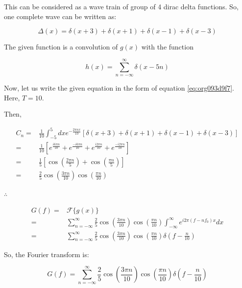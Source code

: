 \documentclass[a4paper,11pt]{article}
\begin{document}
This can be considered as a wave train of group of 4 dirac delta functions. So, one complete wave can be written as:

\begin{equation}
\label{eq:orga10d5ff}
\Delta(x) = \delta(x+3)+\delta(x+1)+\delta(x-1)+\delta(x-3)
\end{equation}

The given function is a convolution of \(g(x)\) with the function

\begin{equation}
\label{eq:org6854040}
h(x) = \sum_{n=-\infty}^{\infty} \delta(x-5n)
\end{equation}

Now, let us write the given equation in the form of equation \ref{eq:org093d9f7}. Here, \(T=10\).

Then,

\begin{equation*}
\begin{split}
C_n = & \frac{1}{10}\int_{-5}^{5} dx e^{-\frac{2\pi n x}{10}} \left[ \delta(x+3)+\delta(x+1)+\delta(x-1)+\delta(x-3)\right] \\
= & \frac{1}{10} \left[e^{\frac{i6\pi n }{10}}+e^{\frac{-i6\pi n }{10}}+e^{\frac{i2\pi n }{10}}+e^{\frac{-i2\pi n }{10}}\right] \\
= & \frac{1}{5}\left[\cos\left(\frac{2\pi n}{5}\right)+\cos\left(\frac{\pi n}{5}\right)\right] \\
= & \frac{2}{5} \cos\left(\frac{3\pi n}{10}\right)\cos\left(\frac{\pi n}{10}\right)
\end{split}
\end{equation*}

\(\therefore\)

\begin{equation*}
\begin{split}
G(f) = & \mathcal{F}\{g(x)\} \\
= & \sum_{n=-\infty}^{\infty}  \frac{2}{5} \cos\left(\frac{3\pi n}{10}\right)\cos\left(\frac{\pi n}{10}\right)\int_{-\infty}^{\infty} e^{i 2\pi (f-nf_0) x} dx   \\
= & \sum_{n=-\infty}^{\infty}  \frac{2}{5} \cos\left(\frac{3\pi n}{10}\right)\cos\left(\frac{\pi n}{10}\right) \delta\left(f-\frac{n}{10}\right)
\end{split}
\end{equation*}

So, the Fourier transform is:

$$G(f) = \sum_{n=-\infty}^{\infty}  \frac{2}{5} \cos\left(\frac{3\pi n}{10}\right)\cos\left(\frac{\pi n}{10}\right) \delta\left(f-\frac{n}{10}\right)$$
\end{document}

